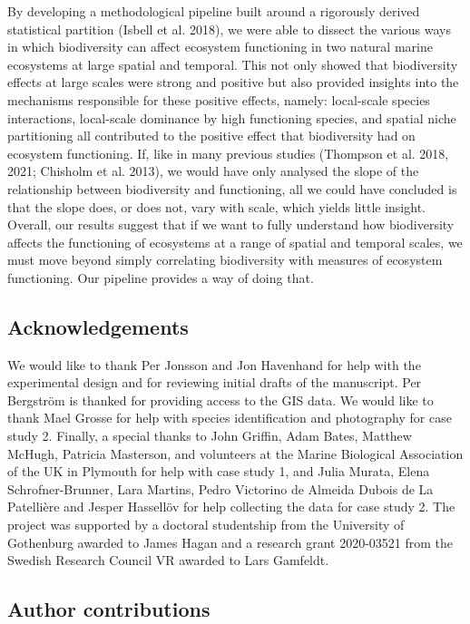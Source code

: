 \documentclass[
  letterpaper,
  DIV=11,
  numbers=noendperiod]{scrartcl}
\begin{document}
By developing a methodological pipeline built around a rigorously
derived statistical partition (Isbell et al. 2018), we were able to
dissect the various ways in which biodiversity can affect ecosystem
functioning in two natural marine ecosystems at large spatial and
temporal. This not only showed that biodiversity effects at large scales
were strong and positive but also provided insights into the mechanisms
responsible for these positive effects, namely: local-scale species
interactions, local-scale dominance by high functioning species, and
spatial niche partitioning all contributed to the positive effect that
biodiversity had on ecosystem functioning. If, like in many previous
studies (Thompson et al. 2018, 2021; Chisholm et al. 2013), we would
have only analysed the slope of the relationship between biodiversity
and functioning, all we could have concluded is that the slope does, or
does not, vary with scale, which yields little insight. Overall, our
results suggest that if we want to fully understand how biodiversity
affects the functioning of ecosystems at a range of spatial and temporal
scales, we must move beyond simply correlating biodiversity with
measures of ecosystem functioning. Our pipeline provides a way of doing
that.

\subsection{Acknowledgements}\label{acknowledgements}

We would like to thank Per Jonsson and Jon Havenhand for help with the
experimental design and for reviewing initial drafts of the manuscript.
Per Bergström is thanked for providing access to the GIS data. We would
like to thank Mael Grosse for help with species identification and
photography for case study 2. Finally, a special thanks to John Griffin,
Adam Bates, Matthew McHugh, Patricia Masterson, and volunteers at the
Marine Biological Association of the UK in Plymouth for help with case
study 1, and Julia Murata, Elena Schrofner-Brunner, Lara Martins, Pedro
Victorino de Almeida Dubois de La Patellière and Jesper Hassellöv for
help collecting the data for case study 2. The project was supported by
a doctoral studentship from the University of Gothenburg awarded to
James Hagan and a research grant 2020-03521 from the Swedish Research
Council VR awarded to Lars Gamfeldt.

\subsection{Author contributions}\label{author-contributions}
\end{document}
